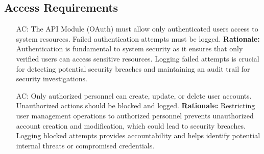 \documentclass{article}
\newcounter{acnum} %
\begin{document}
\subsection{Access Requirements}
\begin{itemize}
    \item [AC\refstepcounter{acnum}\theacnum \label{AC_Autentication}:] The API Module (OAuth) must allow only authenticated users access to system resources. Failed authentication attempts must be logged.
    \textbf{Rationale:} Authentication is fundamental to system security as it ensures that only verified users can access sensitive resources. Logging failed attempts is crucial for detecting potential security breaches and maintaining an audit trail for security investigations.
    
    \item [AC\refstepcounter{acnum}\theacnum \label{AC_AuthorizedPersonnel}:] Only authorized personnel can create, update, or delete user accounts. Unauthorized actions should be blocked and logged.
    \textbf{Rationale:} Restricting user management operations to authorized personnel prevents unauthorized account creation and modification, which could lead to security breaches. Logging blocked attempts provides accountability and helps identify potential internal threats or compromised credentials.
\end{itemize}
\end{document}
